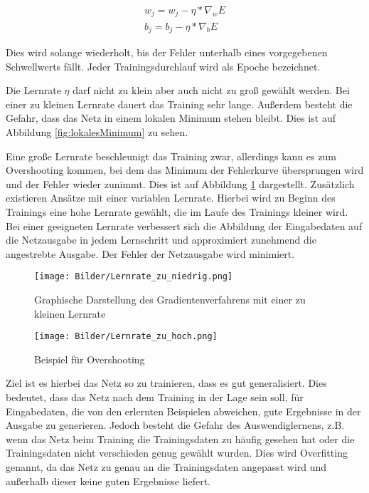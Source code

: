 \begin{subequations}
	\begin{align}
		w_j = w_j - \eta * \nabla_w E \\
		b_j = b_j - \eta * \nabla_b E
	\end{align}
\end{subequations}	

Dies wird solange wiederholt, bis der Fehler unterhalb eines vorgegebenen Schwellwerts fällt. Jeder Trainingsdurchlauf wird als Epoche bezeichnet. 

Die Lernrate $ \eta $ darf nicht zu klein aber auch nicht zu groß gewählt werden. Bei einer zu kleinen Lernrate dauert das Training sehr lange. Außerdem besteht die Gefahr, dass das Netz in einem lokalen Minimum stehen bleibt. Dies ist auf Abbildung \ref{fig:lokalesMinimum} zu sehen. 

Eine große Lernrate beschleunigt das Training zwar, allerdings kann es zum Overshooting kommen, bei dem das Minimum der Fehlerkurve übersprungen wird und der Fehler wieder zunimmt. Dies ist auf  Abbildung \ref{fig:overshooting} dargestellt. Zusätzlich existieren Ansätze mit einer variablen Lernrate. Hierbei wird zu Beginn des Trainings eine hohe Lernrate gewählt, die im Laufe des Trainings kleiner wird.
Bei einer geeigneten Lernrate verbessert sich die Abbildung der Eingabedaten auf die Netzausgabe in jedem Lernschritt und approximiert zunehmend die angestrebte Ausgabe. Der Fehler der Netzausgabe wird minimiert. 

\begin{figure}
	\centering
	\begin {minipage}[t]{0.45\linewidth}
		\centering
		\texttt{[image: Bilder/Lernrate\_zu\_niedrig.png]}
		\caption{Graphische Darstellung des Gradientenverfahrens mit einer zu kleinen Lernrate}
		\label{fig:lokalesMinimum}
	\end{minipage} 
	\hfill
	\begin{minipage}[t]{0.45\linewidth}
		\centering
		\texttt{[image: Bilder/Lernrate\_zu\_hoch.png]}
		\caption{Beispiel für Overshooting}
		\label{fig:overshooting}
	\end{minipage}
\end{figure}

Ziel ist es hierbei das Netz so zu trainieren, dass es gut generalisiert. Dies bedeutet, dass das Netz nach dem Training in der Lage sein soll, für Eingabedaten, die von den erlernten Beispielen abweichen, gute Ergebnisse in der Ausgabe zu generieren. Jedoch besteht die Gefahr des Auswendiglernens, z.B. wenn das Netz beim Training die Trainingsdaten zu häufig gesehen hat oder die Trainingsdaten nicht verschieden genug gewählt wurden. Dies wird Overfitting genannt, da das Netz zu genau an die Trainingsdaten angepasst wird und außerhalb dieser keine guten Ergebnisse liefert. 

